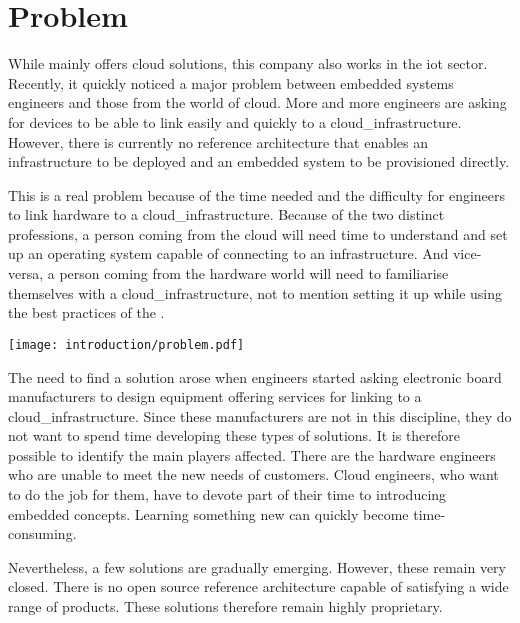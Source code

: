 \section{Problem}

While  mainly offers \gls{cloud} solutions, this company also works in the \acrfull{iot} sector. Recently, it quickly noticed a major problem between embedded systems engineers and those from the world of \gls{cloud}. More and more engineers are asking for devices to be able to link easily and quickly to a \gls{cloud_infrastructure}. However, there is currently no reference architecture that enables an infrastructure to be deployed and an embedded system to be provisioned directly.

This is a real problem because of the time needed and the difficulty for engineers to link hardware to a \gls{cloud_infrastructure}. Because of the two distinct professions, a person coming from the \gls{cloud} will need time to understand and set up an operating system capable of connecting to an infrastructure. And vice-versa, a person coming from the hardware world will need to familiarise themselves with a \gls{cloud_infrastructure}, not to mention setting it up while using the best practices of the .
\begin{center}
    \begingroup
    \texttt{[image: introduction/problem.pdf]}
    \label{fig:problem}
    \endgroup
\end{center}
The need to find a solution arose when engineers started asking electronic board manufacturers to design equipment offering services for linking to a \gls{cloud_infrastructure}. Since these manufacturers are not in this discipline, they do not want to spend time developing these types of solutions. It is therefore possible to identify the main players affected. There are the hardware engineers who are unable to meet the new needs of customers. Cloud engineers, who want to do the job for them, have to devote part of their time to introducing embedded concepts. Learning something new can quickly become time-consuming.

Nevertheless, a few solutions are gradually emerging. However, these remain very closed. There is no open source reference architecture capable of satisfying a wide range of products. These solutions therefore remain highly proprietary.


